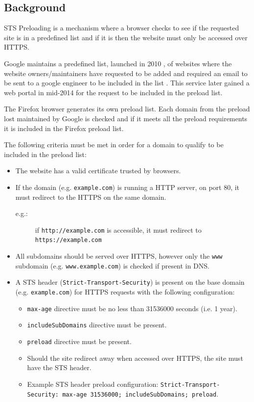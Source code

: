 \documentclass{mscreport}
\begin{document}
\subsection{Background}

STS Preloading is a mechanism where a browser checks to see if the requested site is in a predefined list and if it is then the website must only be accessed over HTTPS.

\vspace{0.3cm} \noindent
Google maintains a predefined list, launched in 2010 \cite{Michael2015-hn}, of websites where the website owners/maintainers have requested to be added and required an email to be sent to a google  engineer to be included in the list \cite{Langley_undated-dm}. This service later gained a web portal in mid-2014 \cite{Michael2015-hn} for the request to be included in the preload list.

\vspace{0.3cm} \noindent
The Firefox browser generates its own preload list. Each domain from the preload lost maintained by Google is checked and if it meets all the preload requirements it is included in the Firefox preload list.

\vspace{0.3cm} \noindent
The following criteria must be met in order for a domain to qualify to be included in the preload list:

\begin{itemize}
  \setlength\itemsep{0.1em}
  \item The website has a valid certificate trusted by browsers.
  \item If the domain (e.g. \texttt{example.com}) is running a HTTP server, on port 80, it must redirect to the HTTPS on the same domain.
  \begin{description}
  \item[e.g.:] if \texttt{http://example.com} is accessible, it must redirect to \texttt{https://example.com}
  \end{description}
  \item All subdomains should be served over HTTPS, however only the \texttt{www} subdomain (e.g. \texttt{www.example.com}) is checked if present in DNS.
  \item A STS header (\texttt{Strict-Transport-Security}) is present on the base domain (e.g. \texttt{example.com}) for HTTPS requests with the following configuration:
  \begin{itemize}
    \item \texttt{max-age} directive must be no less than 31536000 seconds (i.e. 1 year).
    \item \texttt{includeSubDomains} directive must be present.
    \item \texttt{preload} directive must be present.
    \item Should the site redirect away when accessed over HTTPS, the site must have the STS header.
    \item Example STS header preload configuration: \texttt{Strict-Transport-Security: max-age 31536000; includeSubDomains; preload}.
  \end{itemize} 
\end{itemize}
\end{document}
